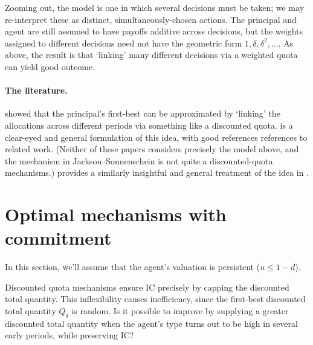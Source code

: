 \begin{remark}
	\label{remark:het}
	Zooming out, the model is one in which several decisions must be taken;
	we may re-interpret these as distinct, simultaneously-chosen actions.
	The principal and agent are still assumed to have payoffs additive across decisions, but the weights assigned to different decisions need not have the geometric form $1, \delta, \delta^2, \dots$.
	As above, the result is that `linking' many different decisions via a weighted quota can yield good outcome.
\end{remark}


\paragraph{The literature.}
\textcite{JacksonSonnenschein2007} showed that the principal's first-best can be approximated by `linking' the allocations across different periods via something like a discounted quota.
\textcite{Frankel2016jet} is a clear-eyed and general formulation of this idea, with good references references to related work.
(Neither of these papers considers precisely the model above,
and the mechanism in Jackson--Sonnenschein is not quite a discounted-quota mechanisms.)
\textcite{Frankel2016aej} provides a similarly insightful and general treatment of the idea in .



\section{Optimal mechanisms with commitment}
\label{sec:ch3:guohorner}

In this section, we'll assume that the agent's valuation is persistent ($u \leq 1-d$).

Discounted quota mechanisms ensure IC
precisely by capping the discounted total quantity.
This inflexibility causes inefficiency, since the first-best discounted total quantity $Q_\delta$ is random.
Is it possible to improve by supplying a greater discounted total quantity when the agent's type turns out to be high in several early periods, while preserving IC?

